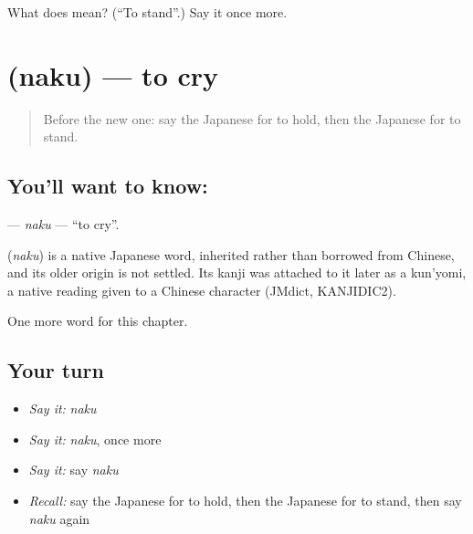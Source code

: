 \begin{tcolorbox}[breakable,colback=teal!4,colframe=teal!35!black,title={Before you move on}]
What does  mean? (\textquotedblleft{}To stand\textquotedblright{}.) Say it once more.
\end{tcolorbox}
\section[\texorpdfstring{\ja{なく} (naku)}{なく (naku)}]{ (naku) — to cry}

\label{lesson:JA-C29-naku}



\begin{quote}
Before the new one: say the Japanese for to hold, then the Japanese for to stand.
\end{quote}

\subsection*{You'll want to know: }
\textbf{} — \emph{naku} — \textquotedblleft{}to cry\textquotedblright{}.

\begin{cousinweb}
\textbf{} (\emph{naku}) is a native Japanese word, inherited rather than borrowed from Chinese, and its older origin is not settled. Its kanji was attached to it later as a kun'yomi, a native reading given to a Chinese character (JMdict, KANJIDIC2).
\end{cousinweb}

\begin{grammarlens}[title={What you've built}]
One more word for this chapter.
\end{grammarlens}

\subsection*{Your turn}
\begin{itemize}
\raggedright
  \item \emph{Say it:} \emph{naku}
  \item \emph{Say it:} \emph{naku}, once more
  \item \emph{Say it:} say \emph{naku}
  \item \emph{Recall:} say the Japanese for to hold, then the Japanese for to stand, then say \emph{naku} again
\end{itemize}

